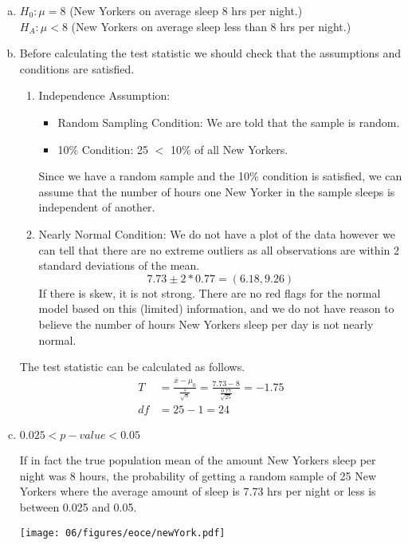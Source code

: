 {
\begin{enumerate}[(a)]
\setlength{\itemsep}{0mm}

\item $H_0: \mu = 8$ (New Yorkers on average sleep 8 hrs per night.) \\
$H_A: \mu < 8$ (New Yorkers on average sleep less than 8 hrs per night.)

\item Before calculating the test statistic we should check that the assumptions and conditions are satisfied.
\begin{enumerate}[1.]
\item Independence Assumption: 
\begin{itemize}
\item Random Sampling Condition: We are told that the sample is random.
\item 10\% Condition: 25 $<$ 10\% of all New Yorkers.
\end{itemize}
Since we have a random sample and the 10\% condition is satisfied, we can assume that the number of hours one New Yorker in the sample sleeps is independent of another.
\item Nearly Normal Condition: We do not have a plot of the data however we can tell that there are no extreme outliers as all observations are within 2 standard deviations of the mean.
\[ 7.73 \pm 2 * 0.77 = (6.18, 9.26) \]
If there is skew, it is not strong. There are no red flags for the normal model based on this (limited) information, and we do not have reason to believe the number of hours New Yorkers sleep per day is not nearly normal. 
\end{enumerate}

The test statistic can be calculated as follows.
\begin{align*}
T &= \frac{\bar{x} - \mu_0}{\frac{s}{\sqrt{n}}} = \frac{7.73 - 8}{\frac{0.77}{\sqrt{25}}} = -1.75\\
df &= 25 - 1 = 24
\end{align*}

\item $0.025 < p-value < 0.05$

\begin{minipage}[c]{0.5\textwidth}
If in fact the true population mean of the amount New Yorkers sleep per night was 8 hours, the probability of getting a random sample of 25 New Yorkers where the average amount of sleep is 7.73 hrs per night or less is between 0.025 and 0.05.
\end{minipage}
\begin{minipage}[c]{0.5\textwidth}
\begin{center}
\texttt{[image: 06/figures/eoce/newYork.pdf]}
\end{center}
\end{minipage}



\end{enumerate}}
